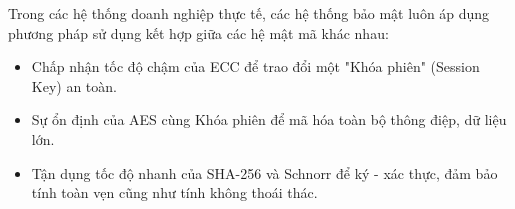 Trong các hệ thống doanh nghiệp thực tế, các hệ thống bảo mật luôn áp dụng phương pháp sử dụng kết hợp giữa các hệ mật mã khác nhau:
\begin{itemize}
	\item Chấp nhận tốc độ chậm của ECC để trao đổi một "Khóa phiên" (Session Key) an toàn.
	\item Sự ổn định của AES cùng Khóa phiên để mã hóa toàn bộ thông điệp, dữ liệu lớn.
	\item Tận dụng tốc độ nhanh của SHA-256 và Schnorr để ký - xác thực, đảm bảo tính toàn vẹn cũng như tính không thoái thác.
\end{itemize}
